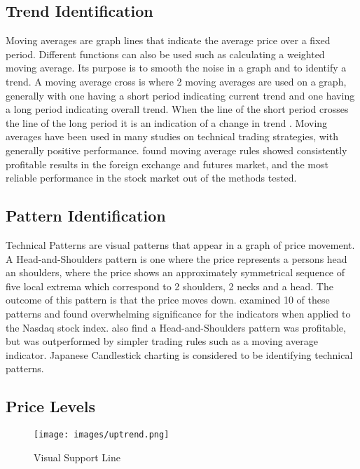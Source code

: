 \documentclass{article}
\theoremstyle{definition}
\begin{document}
\subsection{Trend Identification}
Moving averages are graph lines that indicate the average price over a fixed period. Different functions can also be used such as calculating a weighted moving average. Its purpose is to smooth the noise in a graph and to identify a trend. A moving average cross is where 2 moving averages are used on a graph, generally with one having a short period indicating current trend and one having a long period indicating overall trend. When the line of the short period crosses the line of the long period it is an indication of a change in trend \citep{brock1992}. Moving averages have been used in many studies on technical trading strategies, with generally positive performance. \cite{taprofitability} found moving average rules showed consistently profitable results in the foreign exchange and futures market, and the most reliable performance in the stock market out of the methods tested.

\subsection{Pattern Identification}
Technical Patterns are visual patterns that appear in a graph of price movement. A Head-and-Shoulders pattern is one where the price represents a persons head an shoulders, where the price shows an approximately symmetrical sequence of five local extrema which correspond to 2 shoulders, 2 necks and a head. The outcome of this pattern is that the price moves down. \cite{foundations} examined 10 of these patterns and found overwhelming significance for the indicators when applied to the Nasdaq stock index. \cite{chang1999methodical} also find a Head-and-Shoulders pattern was profitable, but was outperformed by simpler trading rules such as a moving average indicator. Japanese Candlestick charting is considered to be identifying technical patterns.

\subsection{Price Levels}

\begin{figure}[H]
    \centering
    \texttt{[image: images/uptrend.png]}
    \caption{Visual Support Line}
\end{figure}
\end{document}
